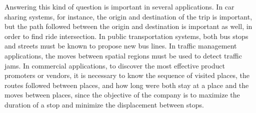\documentclass[12pt]{article}
\begin{document}
Answering this kind of question is important in several applications. In car sharing systems, for instance, the origin and destination of the trip is important, but the path followed between the origin and destination is important as well, in order to find ride intersection. In public transportation systems, both bus stops and streets must be known to propose new bus lines. In traffic management applications, the moves between spatial regions must be used to detect traffic jams. In commercial applications, to discover the most effective product promoters or vendors, it is necessary to know the sequence of visited places, the routes followed between places, and how long were both stay at a place and the moves between places, since the objective of the company is to maximize the duration of a stop and minimize the displacement between stops.

\end{document}
